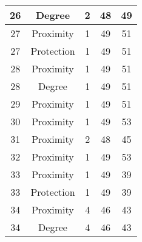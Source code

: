 \documentclass[results.tex]{subfiles}
\begin{document}
\begin{center}
\begin{tabular}{| c || c | c | c | c |}
            \hline
            26                      & Degree                       & 2                      & 48                      & 49                   \\
            \hline
            27                      & Proximity                    & 1                      & 49                      & 51                   \\
            \hline
            27                      & Protection                   & 1                      & 49                      & 51                   \\
            \hline
            28                      & Proximity                    & 1                      & 49                      & 51                   \\
            \hline
            28                      & Degree                       & 1                      & 49                      & 51                   \\
            \hline
            29                      & Proximity                    & 1                      & 49                      & 51                   \\
            \hline
            30                      & Proximity                    & 1                      & 49                      & 53                   \\
            \hline
            31                      & Proximity                    & 2                      & 48                      & 45                   \\
            \hline
            32                      & Proximity                    & 1                      & 49                      & 53                   \\
            \hline
            33                      & Proximity                    & 1                      & 49                      & 39                   \\
            \hline
            33                      & Protection                   & 1                      & 49                      & 39                   \\
            \hline
            34                      & Proximity                    & 4                      & 46                      & 43                   \\
            \hline
            34                      & Degree                       & 4                      & 46                      & 43                   \\

\end{tabular}
\end{center}
\end{document}
